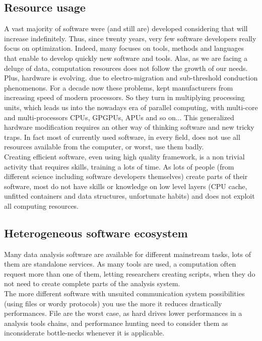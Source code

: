 		\subsection{Resource usage}
			A vast majority of software were (and still are) developed considering that will increase indefinitely.
			Thus, since twenty years, very few software developers really focus on optimization.
			Indeed, many focuses on tools, methods and languages that enable to develop quickly new software and tools.
			Alas, as we are facing a deluge of data, computation resources does not follow the growth of our needs.
			~~\\
			Plus, hardware is evolving. due to electro-migration and sub-threshold conduction phenomenons.
			For a decade now these problems, kept manufacturers from increasing speed of modern processors.
			So they turn in multiplying processing units, which leads us into the nowadays era of parallel computing, with multi-core and multi-processors CPUs, GPGPUs, APUs and so on...
			This generalized hardware modification requires an other way of thinking software and new tricky traps.
			In fact most of currently used software, in every field, does not use all resources available from the computer, or worst, use them badly.
			\\
			Creating efficient software, even using high quality framework, is a non trivial activity that requires skills, training a lots of time.
			As lots of people (from different science including software developers themselves) create parts of their software, most do not have skills or knowledge on low level layers (CPU cache, unfitted containers and data structures, unfortunate habits) and does not exploit all computing resources.

		\subsection{Heterogeneous software ecosystem}
			Many data analysis software are available for different mainstream tasks, lots of them are standalone services.
			As many tools are used, a computation often request more than one of them, letting researchers creating scripts, when they do not need to create complete parts of the analysis system.
			\\
			The more different software with unsuited communication system possibilities (using files or wordy protocols) you use the more it reduces drastically performances.
			File are the worst case, as hard drives lower performances in a analysis tools chains, and performance hunting need to consider them as inconsiderate bottle-necks whenever it is applicable.

